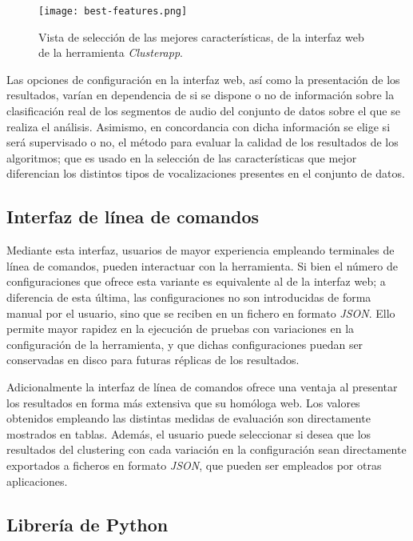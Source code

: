 \begin{figure}[!h]
    \centering
    \texttt{[image: best-features.png]}
    \caption{Vista de selección de las mejores características, de la interfaz web de la herramienta \textit{Clusterapp}.}
    \label{img:best-features}
\end{figure}

Las opciones de configuración en la interfaz web, así como la presentación de los resultados, varían en dependencia de si se dispone o no de información sobre la clasificación real de los segmentos de audio del conjunto de datos sobre el que se realiza el análisis.
Asimismo, en concordancia con dicha información se elige si será supervisado o no, el método para evaluar la calidad de los resultados de los algoritmos;
que es usado en la selección de las características que mejor diferencian los distintos tipos de vocalizaciones presentes en el conjunto de datos.

\subsection{Interfaz de línea de comandos}\label{subsec:CLI}

Mediante esta interfaz, usuarios de mayor experiencia empleando terminales de línea de comandos, pueden interactuar con la herramienta.
Si bien el número de configuraciones que ofrece esta variante es equivalente al de la interfaz web;
a diferencia de esta última, las configuraciones no son introducidas de forma manual por el usuario, sino que se reciben en un fichero en formato \textit{JSON}.
Ello permite mayor rapidez en la ejecución de pruebas con variaciones en la configuración de la herramienta, y que dichas configuraciones puedan ser conservadas en disco para futuras réplicas de los resultados.

Adicionalmente la interfaz de línea de comandos ofrece una ventaja al presentar los resultados en forma más extensiva que su homóloga web.
Los valores obtenidos empleando las distintas medidas de evaluación son directamente mostrados en tablas.
Además, el usuario puede seleccionar si desea que los resultados del clustering con cada variación en la configuración sean directamente exportados a ficheros en formato \textit{JSON}, que pueden ser empleados por otras aplicaciones.

\subsection{Librería de Python}\label{subsec:libreríaDePython}
